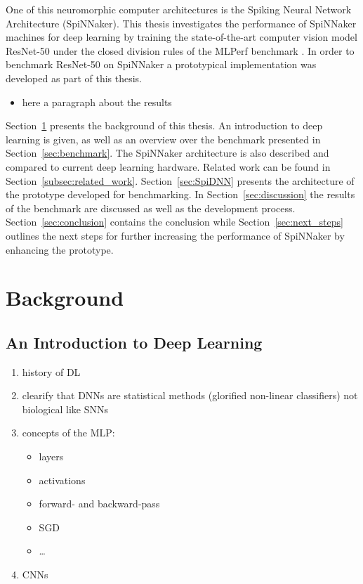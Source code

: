 \documentclass[]{article}
\begin{document}
One of this neuromorphic computer architectures is the Spiking Neural
Network Architecture (SpiNNaker).
This thesis investigates the performance of SpiNNaker machines for
deep learning by training the state-of-the-art computer vision model
ResNet-50 under the closed division rules of the MLPerf benchmark
\citep{he_et_al_2015, mattson_et_al_2019}.
In order to benchmark ResNet-50 on SpiNNaker a prototypical
implementation was developed as part of this thesis.

\begin{itemize}
  \item here a paragraph about the results
\end{itemize}

Section~\ref{sec:background} presents the background of this thesis.
An introduction to deep learning is given, as well as an overview
over the benchmark presented in Section~\ref{sec:benchmark}.
The SpiNNaker architecture is also described and compared to
current deep learning hardware.
Related work can be found in Section~\ref{subsec:related_work}.
Section~\ref{sec:SpiDNN} presents the architecture of the
prototype developed for benchmarking.
In Section~\ref{sec:discussion} the results of the benchmark are
discussed as well as the development process.
Section~\ref{sec:conclusion} contains the conclusion while
Section~\ref{sec:next_steps} outlines the next steps for further
increasing the performance of SpiNNaker by enhancing the
prototype.


\section{Background} %
\label{sec:background}

\subsection{An Introduction to Deep Learning} %

\begin{enumerate}
  \item history of DL
  \item clearify that DNNs are statistical methods (glorified non-linear
        classifiers) not biological like SNNs
  \item concepts of the MLP:
    \begin{itemize}
      \item layers
      \item activations
      \item forward- and backward-pass
      \item SGD
      \item \dots
    \end{itemize}
  \item CNNs
\end{enumerate}
\end{document}

